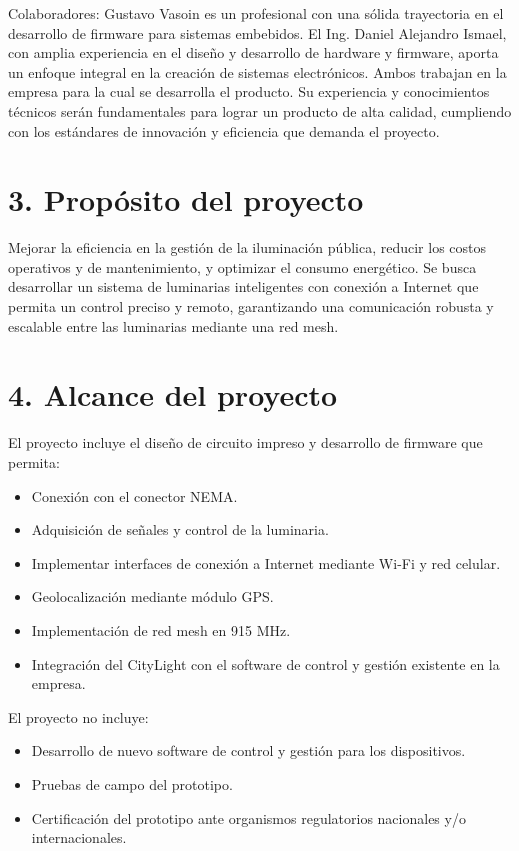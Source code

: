 \documentclass[
11pt, %
]{charter}
\begin{document}
Colaboradores: Gustavo Vasoin es un profesional con una sólida trayectoria en el desarrollo de firmware para sistemas embebidos. El Ing. Daniel Alejandro Ismael, con amplia experiencia en el  diseño y desarrollo de hardware y firmware, aporta un enfoque integral en la creación de sistemas electrónicos. Ambos trabajan en la empresa para la cual se desarrolla el producto. Su experiencia y conocimientos técnicos serán fundamentales para lograr un producto de alta calidad, cumpliendo con los estándares de innovación y eficiencia que demanda el proyecto.

\section{3. Propósito del proyecto}
\label{sec:proposito}

Mejorar la eficiencia en la gestión de la iluminación pública, reducir los costos operativos y de mantenimiento, y optimizar el consumo energético. Se busca desarrollar un sistema de luminarias inteligentes con conexión a Internet que permita un control preciso y remoto, garantizando una comunicación robusta y escalable entre las luminarias mediante una red mesh.

\pagebreak

\section{4. Alcance del proyecto}
\label{sec:alcance}

El proyecto incluye el diseño de circuito impreso y desarrollo de firmware que permita:
\begin{itemize}
	\item Conexión con el conector NEMA.
	\item Adquisición de señales y control de la luminaria.
	\item Implementar interfaces de conexión a Internet mediante Wi-Fi y red celular.
	\item Geolocalización mediante módulo GPS.
	\item Implementación de red mesh en 915 MHz.
	\item Integración del CityLight con el software de control y gestión existente en la empresa.
\end{itemize}	

El proyecto no incluye:
\begin{itemize}
	\item Desarrollo de nuevo software de control y gestión para los dispositivos.
	\item Pruebas de campo del prototipo.
	\item Certificación del prototipo ante organismos regulatorios nacionales y/o internacionales.
\end{itemize}
\end{document}

